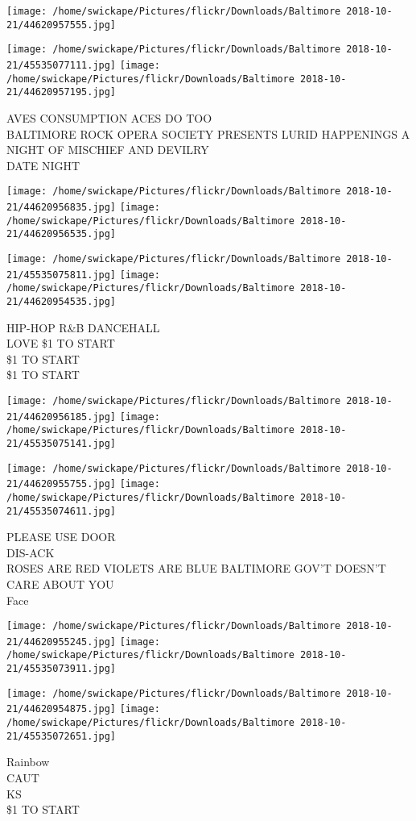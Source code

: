 \documentclass[10pt,letterpaper]{article}
\begin{document}
\texttt{[image: /home/swickape/Pictures/flickr/Downloads/Baltimore 2018-10-21/44620957555.jpg]}

\vspace{0.25in}
\texttt{[image: /home/swickape/Pictures/flickr/Downloads/Baltimore 2018-10-21/45535077111.jpg]}
\texttt{[image: /home/swickape/Pictures/flickr/Downloads/Baltimore 2018-10-21/44620957195.jpg]}

AVES CONSUMPTION ACES DO TOO\\
BALTIMORE ROCK OPERA SOCIETY PRESENTS LURID HAPPENINGS A NIGHT OF MISCHIEF AND DEVILRY\\
DATE NIGHT\\
\pagebreak

\texttt{[image: /home/swickape/Pictures/flickr/Downloads/Baltimore 2018-10-21/44620956835.jpg]}
\texttt{[image: /home/swickape/Pictures/flickr/Downloads/Baltimore 2018-10-21/44620956535.jpg]}

\texttt{[image: /home/swickape/Pictures/flickr/Downloads/Baltimore 2018-10-21/45535075811.jpg]}
\texttt{[image: /home/swickape/Pictures/flickr/Downloads/Baltimore 2018-10-21/44620954535.jpg]}

HIP{-}HOP R\&B DANCEHALL\\
LOVE \$1 TO START\\
\$1 TO START\\
\$1 TO START\\
\pagebreak

\texttt{[image: /home/swickape/Pictures/flickr/Downloads/Baltimore 2018-10-21/44620956185.jpg]}
\texttt{[image: /home/swickape/Pictures/flickr/Downloads/Baltimore 2018-10-21/45535075141.jpg]}

\texttt{[image: /home/swickape/Pictures/flickr/Downloads/Baltimore 2018-10-21/44620955755.jpg]}
\texttt{[image: /home/swickape/Pictures/flickr/Downloads/Baltimore 2018-10-21/45535074611.jpg]}

PLEASE USE DOOR\\
DIS{-}ACK\\
ROSES ARE RED VIOLETS ARE BLUE BALTIMORE GOV'T DOESN'T CARE ABOUT YOU\\
Face\\
\pagebreak

\texttt{[image: /home/swickape/Pictures/flickr/Downloads/Baltimore 2018-10-21/44620955245.jpg]}
\texttt{[image: /home/swickape/Pictures/flickr/Downloads/Baltimore 2018-10-21/45535073911.jpg]}

\texttt{[image: /home/swickape/Pictures/flickr/Downloads/Baltimore 2018-10-21/44620954875.jpg]}
\texttt{[image: /home/swickape/Pictures/flickr/Downloads/Baltimore 2018-10-21/45535072651.jpg]}

Rainbow\\
CAUT\\
KS\\
\$1 TO START\\
\pagebreak
\end{document}

